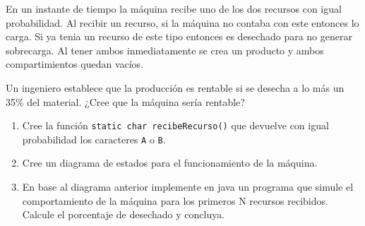 \documentclass[dcc,uchile]{fcfmcourse}
\begin{document}
\begin{problems}
En un instante de tiempo la máquina recibe uno de los dos recursos con igual probabilidad. Al recibir un recurso, si la máquina no contaba con este entonces lo carga. Si ya tenia un recurso de este tipo entonces es desechado para no generar sobrecarga. Al tener ambos inmediatamente se crea un producto y ambos compartimientos quedan vacíos.

Un ingeniero establece que la producción es rentable si se desecha a lo más un 35\% del material. ¿Cree que la máquina sería rentable?

\begin{enumerate}
    \item Cree la función \texttt{static char recibeRecurso()} que devuelve con igual probabilidad los caracteres \texttt{A} o \texttt{B}.
    \item Cree un diagrama de estados para el funcionamiento de la máquina.
    \item En base al diagrama anterior implemente en java un programa que simule el comportamiento de la máquina para los primeros N recursos recibidos. Calcule el porcentaje de desechado y concluya.
\end{enumerate}

\end{problems}
\end{document}
